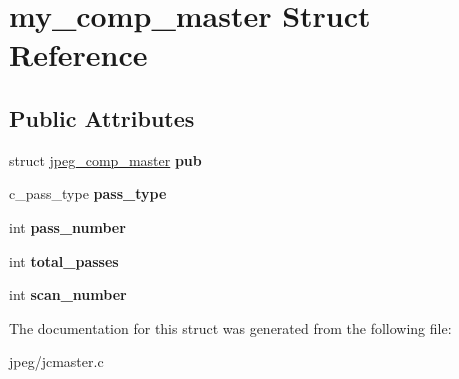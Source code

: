 \hypertarget{structmy__comp__master}{}\section{my\+\_\+comp\+\_\+master Struct Reference}
\label{structmy__comp__master}
\subsection*{Public Attributes}
\begin{DoxyCompactItemize}
\item 
struct \hyperlink{structjpeg__comp__master}{jpeg\+\_\+comp\+\_\+master} {\bfseries pub}\hypertarget{structmy__comp__master_a92f91e2f4b79fd0e6ae36f24d8f455f0}{}\label{structmy__comp__master_a92f91e2f4b79fd0e6ae36f24d8f455f0}

\item 
c\+\_\+pass\+\_\+type {\bfseries pass\+\_\+type}\hypertarget{structmy__comp__master_ab153ff271327de71553b428d057e991b}{}\label{structmy__comp__master_ab153ff271327de71553b428d057e991b}

\item 
int {\bfseries pass\+\_\+number}\hypertarget{structmy__comp__master_a08c52f446296c1890808382af30ae43d}{}\label{structmy__comp__master_a08c52f446296c1890808382af30ae43d}

\item 
int {\bfseries total\+\_\+passes}\hypertarget{structmy__comp__master_abc21ff7e11e64247ad8ff68ad819e9fc}{}\label{structmy__comp__master_abc21ff7e11e64247ad8ff68ad819e9fc}

\item 
int {\bfseries scan\+\_\+number}\hypertarget{structmy__comp__master_a85aabce3d888eccfaf21eeb8c5cc8606}{}\label{structmy__comp__master_a85aabce3d888eccfaf21eeb8c5cc8606}

\end{DoxyCompactItemize}


The documentation for this struct was generated from the following file\+:\begin{DoxyCompactItemize}
\item 
jpeg/jcmaster.\+c\end{DoxyCompactItemize}
